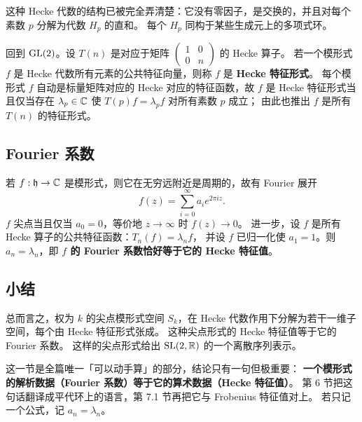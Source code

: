 这种 Hecke 代数的结构已被完全弄清楚：它没有零因子，是交换的，并且对每个素数 $p$ 分解为代数 $H_p$ 的直和。
每个 $H_p$ 同构于某些生成元上的多项式环。

回到 $\mathrm{GL}(2)$。设 $T(n)$ 是对应于矩阵 $\begin{pmatrix}1&0\\0&n\end{pmatrix}$ 的 Hecke 算子。
若一个模形式 $f$ 是 Hecke 代数所有元素的公共特征向量，则称 $f$ 是 \textbf{Hecke 特征形式}。
每个模形式 $f$ 自动是标量矩阵对应的 Hecke 对应的特征函数，故
$f$ 是 Hecke 特征形式当且仅当存在 $\lambda_p\in\mathbb{C}$ 使 $T(p)f=\lambda_pf$ 对所有素数 $p$ 成立；
由此也推出 $f$ 是所有 $T(n)$ 的特征形式。

\subsection{Fourier 系数}

若 $f:\mathfrak{h}\to\mathbb{C}$ 是模形式，则它在无穷远附近是周期的，故有 Fourier 展开
\[
f(z)=\sum_{i=0}^{\infty}a_ie^{2\pi iz}.
\]
$f$ 尖点当且仅当 $a_0=0$，等价地 $z\to\infty$ 时 $f(z)\to 0$。
进一步，设 $f$ 是所有 Hecke 算子的公共特征函数：$T_n(f)=\lambda_nf$，
并设 $f$ 已归一化使 $a_1=1$。则 $a_n=\lambda_n$，即 \textbf{$f$ 的 Fourier 系数恰好等于它的 Hecke 特征值}。

\subsection{小结}

总而言之，权为 $k$ 的尖点模形式空间 $S_k$，在 Hecke 代数作用下分解为若干一维子空间，每个由 Hecke 特征形式张成。
这种尖点形式的 Hecke 特征值等于它的 Fourier 系数。
这样的尖点形式给出 $\mathrm{SL}(2,\mathbb{R})$ 的一个离散序列表示。

\begin{keytakeaways}
这一节是全篇唯一「可以动手算」的部分，结论只有一句但极重要：
\textbf{一个模形式的解析数据（Fourier 系数）等于它的算术数据（Hecke 特征值）}。
第 6 节把这句话翻译成平代环上的语言，第 7.1 节再把它与 Frobenius 特征值对上。
若只记一个公式，记 $a_n=\lambda_n$。
\end{keytakeaways}
